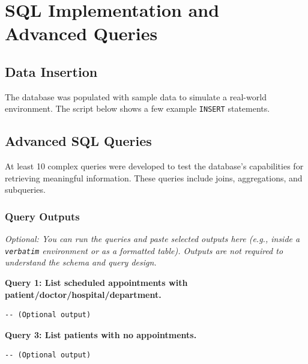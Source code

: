 \section{SQL Implementation and Advanced Queries}

\subsection{Data Insertion}
The database was populated with sample data to simulate a real-world environment. The script below shows a few example \texttt{INSERT} statements.



\subsection{Advanced SQL Queries}
At least 10 complex queries were developed to test the database's capabilities for retrieving meaningful information. These queries include joins, aggregations, and subqueries.



\subsubsection{Query Outputs}
\textit{Optional: You can run the queries and paste selected outputs here (e.g., inside a \texttt{verbatim} environment or as a formatted table). Outputs are not required to understand the schema and query design.}

\textbf{Query 1: List scheduled appointments with patient/doctor/hospital/department.}
\begin{verbatim}
-- (Optional output)
\end{verbatim}

\textbf{Query 3: List patients with no appointments.}
\begin{verbatim}
-- (Optional output)
\end{verbatim}
